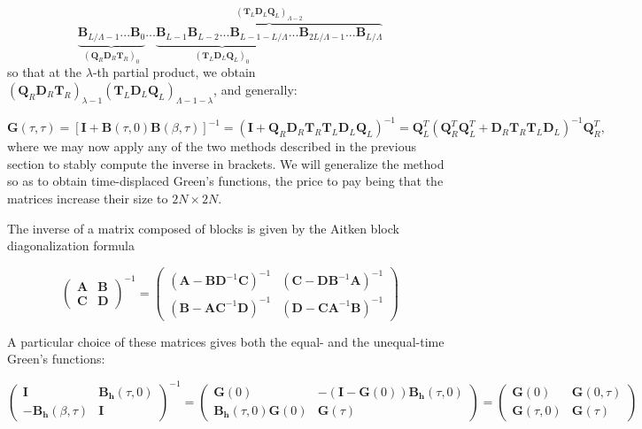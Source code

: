 \begin{equation}
\underbrace{\bm B_{L / \Lambda - 1} ...  \bm B_0}_{(\bm Q_R \bm D_R \bm T_R)_{0}} ... \overbrace{ \underbrace{\bm B_{L - 1} \bm B_{L-2} ... \bm B_{L - 1- L / \Lambda}}_{(\bm T_L \bm D_L \bm Q_L)_{0} } ...  \bm B_{2 L / \Lambda -1} ...\bm B_{L / \Lambda} }^{(\bm T_L \bm D_L \bm Q_L)_{\Lambda - 2}} 
\end{equation}
so that at the $\lambda$-th partial product, we obtain $(\bm Q_R \bm D_R \bm T_R )_{\lambda -1} (\bm T_L \bm D_L \bm Q_L )_{\Lambda - 1 - \lambda}$, and generally:

\begin{equation}
\bm G ( \tau, \tau ) = [\bm I + \bm B ( \tau, 0 ) \bm B ( \beta, \tau ) ]^{-1} = ( \bm I + \bm Q_R \bm D_R \bm T_R \bm T_L \bm D_L \bm Q_L )^{-1} = \bm Q_L^T ( \bm Q_R^T \bm Q_L^T + \bm D_R \bm T_R \bm T_L \bm D_L )^{-1} \bm Q_R^T ,
\end{equation}
where we may now apply any of the two methods described in the previous section to stably compute the inverse in brackets.
We will generalize the  method so as to obtain time-displaced Green's functions, the price to pay being that the matrices increase their size to $2 N \times 2 N$.

The inverse of a matrix composed of blocks is given by the Aitken block diagonalization formula

\begin{equation}
\begin{pmatrix}
\bm A & \bm B \\
\bm C & \bm D
\end{pmatrix}^{-1}
=
\begin{pmatrix}
( \bm A - \bm B \bm D^{-1} \bm C )^{-1} & ( \bm C - \bm D \bm B^{-1} \bm A )^{-1} \\
( \bm B - \bm A \bm C^{-1} \bm D )^{-1} & ( \bm D - \bm C \bm A^{-1} \bm B )^{-1}
\end{pmatrix}
\end{equation}

A particular choice of these matrices gives both the equal- and the unequal-time Green's functions:

\begin{equation}
\begin{pmatrix}
\bm I & \bm B_{\bm h} (\tau, 0) \\
-\bm B_{\bm h} ( \beta, \tau ) & \bm I
\end{pmatrix}^{-1}
=
\begin{pmatrix}
\bm G ( 0 ) & - ( \bm I - \bm G ( 0 ) ) \bm B_{\bm h} ( \tau, 0 )  \\
\bm B_{\bm h} ( \tau, 0 ) \bm G ( 0 ) & \bm G ( \tau ) 
\end{pmatrix}
=
\begin{pmatrix}
\bm G ( 0 ) & \bm G ( 0, \tau )  \\
\bm G ( \tau, 0 ) & \bm G ( \tau ) 
\end{pmatrix}
\end{equation}

